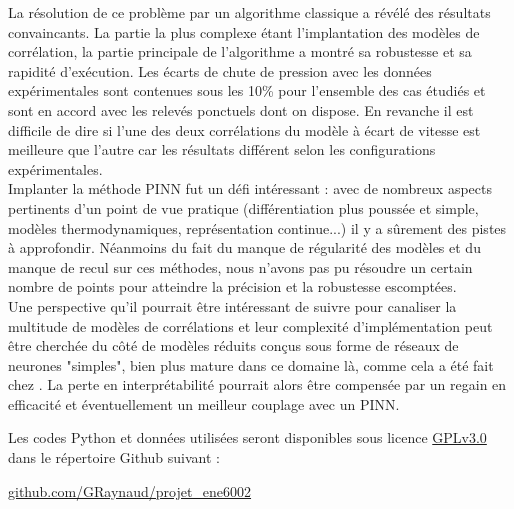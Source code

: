 La résolution de ce problème par un algorithme classique a révélé des résultats convaincants. La partie la plus complexe étant l'implantation des modèles de corrélation, la partie principale de l'algorithme a montré sa robustesse et sa rapidité d'exécution. Les écarts de chute de pression avec les données expérimentales sont contenues sous les 10\% pour l'ensemble des cas étudiés et sont en accord avec les relevés ponctuels dont on dispose. En revanche il est difficile de dire si l'une des deux corrélations du modèle à écart de vitesse est meilleure que l'autre car les résultats différent selon les configurations expérimentales.\\

Implanter la méthode PINN fut un défi intéressant : avec de nombreux aspects pertinents d'un point de vue pratique (différentiation plus poussée et simple, modèles thermodynamiques, représentation continue...) il y a sûrement des pistes à approfondir. Néanmoins du fait du manque de régularité des modèles et du manque de recul sur ces méthodes, nous n'avons pas pu résoudre un certain nombre de points pour atteindre la précision et la robustesse escomptées.\\

Une perspective qu'il pourrait être intéressant de suivre pour canaliser la multitude de modèles de corrélations et leur complexité d'implémentation peut être cherchée du côté de modèles réduits conçus sous forme de réseaux de neurones "simples", bien plus mature dans ce domaine là, comme cela a été fait chez \cite{alvarezdelcastilloNewVoidFraction2012}. La perte en interprétabilité pourrait alors être compensée par un regain en efficacité et éventuellement un meilleur couplage avec un PINN.\\

\medskip

Les codes Python et données utilisées seront disponibles sous licence \href{https://choosealicense.com/licenses/gpl-3.0/}{GPLv3.0} dans le répertoire Github suivant :
\begin{center}
    \href{https://github.com/GRaynaud/projet_ene6002}{github.com/GRaynaud/projet\_ene6002}
\end{center}